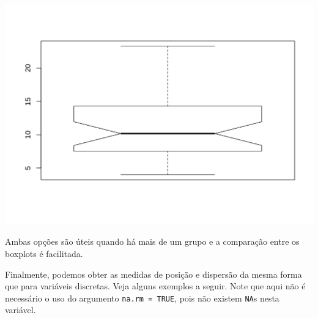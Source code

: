 \documentclass[10pt,a4paper]{book}
\newenvironment{Shaded}{\begin{snugshade}}{\end{snugshade}}
\newcommand{\KeywordTok}[1]{\textcolor[rgb]{0.13,0.29,0.53}{\textbf{#1}}}
\newcommand{\DataTypeTok}[1]{\textcolor[rgb]{0.13,0.29,0.53}{#1}}
\newcommand{\OtherTok}[1]{\textcolor[rgb]{0.56,0.35,0.01}{#1}}
\newcommand{\OperatorTok}[1]{\textcolor[rgb]{0.81,0.36,0.00}{\textbf{#1}}}
\newcommand{\NormalTok}[1]{#1}
\begin{document}
\begin{Shaded}
\end{Shaded}

\begin{center}\includegraphics{figures/unnamed-chunk-312-1} \end{center}

Ambas opções são úteis quando há mais de um grupo e a comparação entre
os boxplots é facilitada.

Finalmente, podemos obter as medidas de posição e dispersão da mesma
forma que para variáveis discretas. Veja alguns exemplos a seguir. Note
que aqui não é necessário o uso do argumento \texttt{na.rm\ =\ TRUE},
pois não existem \texttt{NA}s nesta variável.
\end{document}
